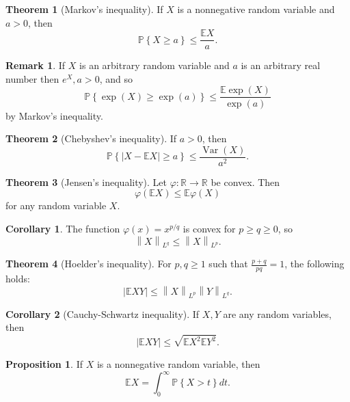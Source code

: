 \documentclass{article}
\theoremstyle{definition}
\newtheorem{theorem}{Theorem}[section]
\newtheorem{proposition}{Proposition}[section]
\newtheorem{corollary}{Corollary}[section]
\newtheorem{remark}{Remark}[section]
\begin{document}
  \begin{theorem}[Markov's inequality]
    If \( X \) is a nonnegative random variable and \( a > 0 \), then
    \[
      \mathbb{P}\left\{ X \geq a \right\} \leq \frac{\mathbb{E}X}{a} .
    \]
  \end{theorem}

  \begin{remark}
    If \( X \) is an arbitrary random variable and \( a \) is an
    arbitrary real number then \( e^{X}, a>0 \), and so
    \[
      \mathbb{P}\left\{ \exp(X) \geq \exp(a)  \right\} \leq
      \frac{\mathbb{E}\exp(X) }{\exp(a) }
    \]
    by Markov's inequality.
  \end{remark}

  \begin{theorem}[Chebyshev's inequality]
    If \( a>0 \), then
    \[
      \mathbb{P}\left\{ | X - \mathbb{E}X | \geq a \right\} \leq
      \frac{\operatorname{Var}(X)}{a^2} .
    \]
  \end{theorem}

  \begin{theorem}[Jensen's inequality]
    Let \( \varphi: \mathbb{R} \rightarrow \mathbb{R} \) be convex. Then
    \[
      \varphi(\mathbb{E}X) \leq \mathbb{E}\varphi(X)
    \]
    for any random variable \( X \).
  \end{theorem}

  \begin{corollary}
    The function \( \varphi(x) = x^{p/q} \) is convex for \( p \geq q
    \geq 0 \), so
    \[
      \left\| X \right\|_{L^q} \leq \left\| X \right\|_{L^p}.
    \]
  \end{corollary}

  \begin{theorem}[Hoelder's inequality]
    For \( p,q \geq 1 \) such that \( \frac{p+q}{pq} = 1 \), the
    following holds:
    \[
      \left| \mathbb{E}XY \right| \leq \left\| X \right\|_{L^p} \left\|
      Y \right\|_{L^q}.
    \]
  \end{theorem}

  \begin{corollary}[Cauchy-Schwartz inequality]
    If \( X, Y \) are any random variables, then
    \[
      \left| \mathbb{E}XY \right| \leq \sqrt{\mathbb{E}X^{2} \mathbb{E}Y^{2}}.
    \]
  \end{corollary}

  \begin{proposition}
    If \( X \) is a nonnegative random variable, then
    \[
      \mathbb{E}X = \int_{0}^{\infty} \mathbb{P}\left\{ X > t \right\}dt.
    \]
  \end{proposition}
\end{document}
